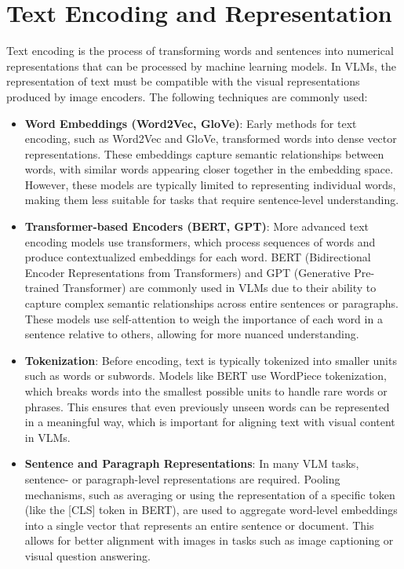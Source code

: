\section{Text Encoding and Representation}

Text encoding is the process of transforming words and sentences into numerical representations that can be processed by machine learning models. In VLMs, the representation of text must be compatible with the visual representations produced by image encoders. The following techniques are commonly used:

\begin{itemize}
    \item \textbf{Word Embeddings (Word2Vec, GloVe)}: Early methods for text encoding, such as Word2Vec and GloVe, transformed words into dense vector representations. These embeddings capture semantic relationships between words, with similar words appearing closer together in the embedding space. However, these models are typically limited to representing individual words, making them less suitable for tasks that require sentence-level understanding.
    \item \textbf{Transformer-based Encoders (BERT, GPT)}: More advanced text encoding models use transformers, which process sequences of words and produce contextualized embeddings for each word. BERT (Bidirectional Encoder Representations from Transformers) and GPT (Generative Pre-trained Transformer) are commonly used in VLMs due to their ability to capture complex semantic relationships across entire sentences or paragraphs. These models use self-attention to weigh the importance of each word in a sentence relative to others, allowing for more nuanced understanding.
    \item \textbf{Tokenization}: Before encoding, text is typically tokenized into smaller units such as words or subwords. Models like BERT use WordPiece tokenization, which breaks words into the smallest possible units to handle rare words or phrases. This ensures that even previously unseen words can be represented in a meaningful way, which is important for aligning text with visual content in VLMs.
    \item \textbf{Sentence and Paragraph Representations}: In many VLM tasks, sentence- or paragraph-level representations are required. Pooling mechanisms, such as averaging or using the representation of a specific token (like the [CLS] token in BERT), are used to aggregate word-level embeddings into a single vector that represents an entire sentence or document. This allows for better alignment with images in tasks such as image captioning or visual question answering.
\end{itemize}


